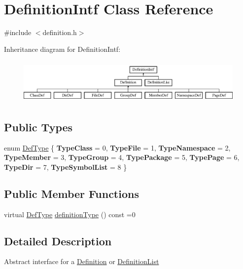 \hypertarget{class_definition_intf}{}\section{Definition\+Intf Class Reference}
\label{class_definition_intf}


{\ttfamily \#include $<$definition.\+h$>$}

Inheritance diagram for Definition\+Intf\+:\begin{figure}[H]
\begin{center}
\leavevmode
\includegraphics[height=2.264151cm]{class_definition_intf}
\end{center}
\end{figure}
\subsection*{Public Types}
\begin{DoxyCompactItemize}
\item 
enum \mbox{\hyperlink{class_definition_intf_ada60114bc621669dd8c19edfc6421766}{Def\+Type}} \{ \newline
{\bfseries Type\+Class} = 0, 
{\bfseries Type\+File} = 1, 
{\bfseries Type\+Namespace} = 2, 
{\bfseries Type\+Member} = 3, 
\newline
{\bfseries Type\+Group} = 4, 
{\bfseries Type\+Package} = 5, 
{\bfseries Type\+Page} = 6, 
{\bfseries Type\+Dir} = 7, 
\newline
{\bfseries Type\+Symbol\+List} = 8
 \}
\end{DoxyCompactItemize}
\subsection*{Public Member Functions}
\begin{DoxyCompactItemize}
\item 
virtual \mbox{\hyperlink{class_definition_intf_ada60114bc621669dd8c19edfc6421766}{Def\+Type}} \mbox{\hyperlink{class_definition_intf_ac8ee00bc1af5558ae37f6896d16f5a3a}{definition\+Type}} () const =0
\end{DoxyCompactItemize}


\subsection{Detailed Description}
Abstract interface for a \mbox{\hyperlink{class_definition}{Definition}} or \mbox{\hyperlink{class_definition_list}{Definition\+List}} 

